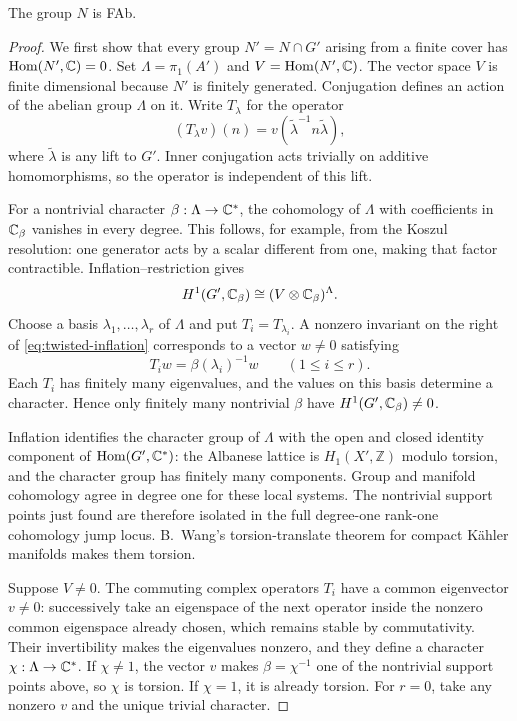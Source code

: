 \begin{proposition}\label{prop:fibre-fab}
The group \(N\) is FAb.
\end{proposition}
\begin{proof}
We first show that every group \(N'=N\cap G'\) arising from a
finite cover has \(\operatorname{Hom}(N',\mathbb C)=0\). Set
\(\Lambda=\pi_1(A')\) and
\(V=\operatorname{Hom}(N',\mathbb C)\). The vector space \(V\) is finite dimensional
because \(N'\) is finitely generated. Conjugation defines an action
of the abelian group \(\Lambda\) on it. Write \(T_\lambda\) for the
operator
\[
 (T_\lambda v)(n)=v(\widetilde\lambda^{-1}n\widetilde\lambda),
\]
where \(\widetilde\lambda\) is any lift to \(G'\). Inner conjugation
acts trivially on additive homomorphisms, so the operator is
independent of this lift.

For a nontrivial character \(\beta:\Lambda\to\mathbb C^*\), the
cohomology of \(\Lambda\) with coefficients in \(\mathbb C_\beta\)
vanishes in every degree. This follows, for example, from the
Koszul resolution: one generator acts by a scalar different from
one, making that factor contractible. Inflation--restriction gives
\begin{equation}\label{eq:twisted-inflation}
 H^1(G',\mathbb C_\beta)
 \cong (V\otimes\mathbb C_\beta)^\Lambda.
\end{equation}
Choose a basis \(\lambda_1,\ldots,\lambda_r\) of \(\Lambda\) and put
\(T_i=T_{\lambda_i}\). A nonzero invariant on the right of
\eqref{eq:twisted-inflation} corresponds to a vector \(w\ne0\)
satisfying
\[
 T_iw=\beta(\lambda_i)^{-1}w\qquad(1\le i\le r).
\]
Each \(T_i\) has finitely many eigenvalues, and the values on this
basis determine a character. Hence only finitely many nontrivial
\(\beta\) have \(H^1(G',\mathbb C_\beta)\ne0\).

Inflation identifies the character group of \(\Lambda\) with the
open and closed identity component of \(\operatorname{Hom}(G',\mathbb C^*)\):
the Albanese lattice is \(H_1(X',\mathbb Z)\) modulo torsion, and the
character group has finitely many components. Group and manifold
cohomology agree in degree one for these local systems. The nontrivial
support points just found are therefore isolated in the full
degree-one rank-one cohomology jump locus. B.~Wang's torsion-translate
theorem for compact K\"ahler manifolds
\cite[author's version, Theorem~1.3]{BWang2016} makes them torsion.

Suppose \(V\ne0\). The commuting complex operators \(T_i\) have a
common eigenvector \(v\ne0\): successively take an eigenspace of the
next operator inside the nonzero common eigenspace already chosen,
which remains stable by commutativity. Their invertibility makes the
eigenvalues nonzero, and they define a character
\(\chi:\Lambda\to\mathbb C^*\). If \(\chi\ne1\), the vector \(v\) makes
\(\beta=\chi^{-1}\) one of the nontrivial support points above, so
\(\chi\) is torsion. If \(\chi=1\), it is already torsion. For
\(r=0\), take any nonzero \(v\) and the unique trivial character.


\end{proof}
